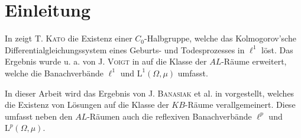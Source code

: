 

\chapter{Einleitung}

\par
In \cite{kato_1954}
zeigt \textsc{T. Kato} die Existenz einer $C_0$-Halbgruppe, welche das Kolmogorov'sche Differentialgleichungssystem eines Geburts- und Todesprozesses in $\ell^1$ löst. Das Ergebnis wurde u. a. von \textsc{J. Voigt} in \cite{voigt_1989} %
auf die Klasse der $AL$-Räume erweitert, welche die Banachverbände  $\ell^1$ und $\text{L}^1(\Omega,\mu)$ umfasst.
\par
In dieser Arbeit wird das Ergebnis von \textsc{J. Banasiak} et al. in \cite{banasiak_lachowicz_2007}
vorgestellt, welches die Existenz von Lösungen auf die Klasse der $KB$-Räume verallgemeinert. Diese umfasst neben den $AL$-Räumen auch die reflexiven Banachverbände $\ell^p$ und $\text{L}^p(\Omega,\mu)$. 
\par

